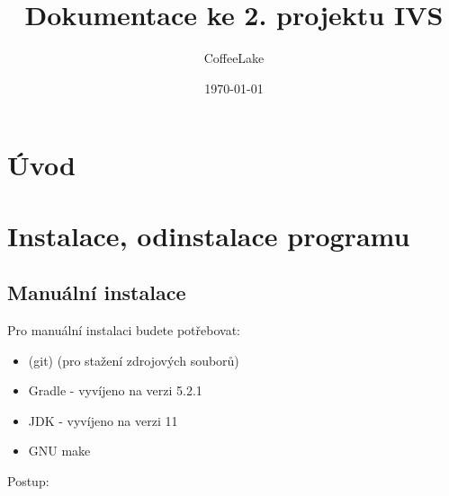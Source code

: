 \documentclass[a4paper, 11pt]{article}
\title{Dokumentace ke 2. projektu IVS}
\author{CoffeeLake}
\date{\today}
\begin{document}
	
\maketitle
\tableofcontents


\newpage

\section{Úvod}

\section{Instalace, odinstalace programu}

\subsection{Manuální instalace}

Pro manuální instalaci budete potřebovat:

\begin{itemize}
	\item (git) (pro stažení zdrojových souborů)
	\item Gradle - vyvíjeno na verzi 5.2.1
	\item JDK - vyvíjeno na verzi 11
	\item GNU make
\end{itemize}

Postup:
\end{document}
